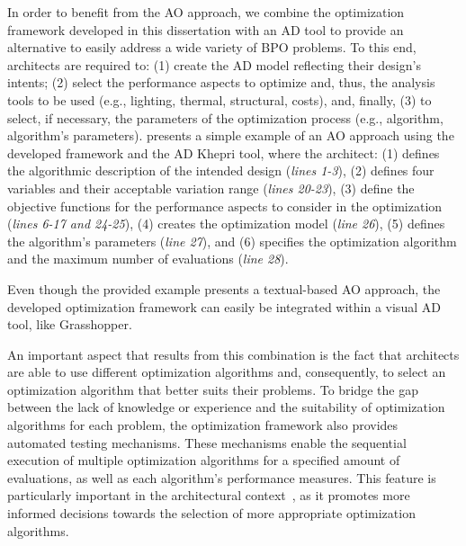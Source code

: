 In order to benefit from the \ac{AO} approach, we combine the optimization framework developed in this dissertation with an \ac{AD} tool to provide an alternative to easily address a wide variety of \ac{BPO} problems. To this end, architects are required to: (1) create the \ac{AD} model reflecting their design's intents; (2) select the performance aspects to optimize and, thus, the analysis tools to be used (e.g., lighting, thermal, structural, costs), and, finally, (3) to select, if necessary, the parameters of the optimization process (e.g., algorithm, algorithm's parameters). %
 presents a simple example of an \ac{AO} approach using the developed framework and the \ac{AD} Khepri tool, where the architect: (1) defines the algorithmic description of the intended design (\textit{lines 1-3}), (2) defines four variables and their acceptable variation range (\textit{lines 20-23}), (3) define the objective functions for the performance aspects to consider in the optimization (\textit{lines 6-17 and 24-25}), (4) creates the optimization model (\textit{line 26}), (5) defines the algorithm's parameters (\textit{line 27}), and (6) specifies the optimization algorithm and the maximum number of evaluations (\textit{line 28}).

Even though the provided example presents a textual-based \ac{AO} approach, the developed optimization framework can easily be integrated within a visual \ac{AD} tool, like Grasshopper. 

An important aspect that results from this combination is the fact that architects are able to use different optimization algorithms and, consequently, to select an optimization algorithm that better suits their problems. To bridge the gap between the lack of knowledge or experience and the suitability of optimization algorithms for each problem, the optimization framework also provides automated testing mechanisms. These mechanisms enable the sequential execution of multiple optimization algorithms for a specified amount of evaluations, as well as each algorithm's performance measures. This feature is particularly important in the architectural context~\cite{Wortmann2016BBO,Hamdy2016}, as it promotes more informed decisions towards the selection of more appropriate optimization algorithms.


